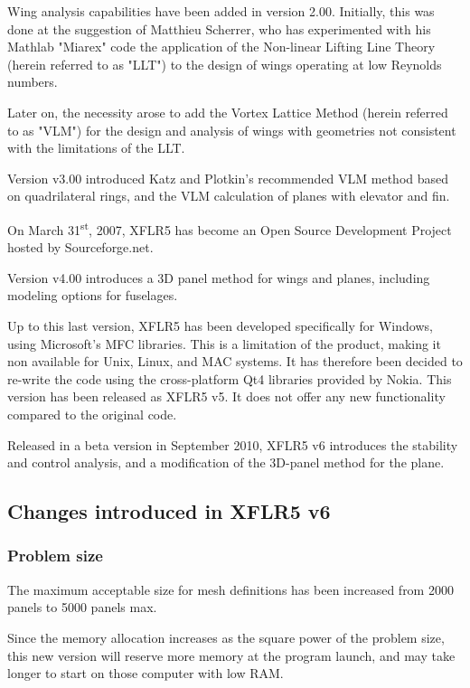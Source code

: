 \documentclass[a4paper,twoside,12pt,dvips]{article}
\begin{document}
Wing analysis capabilities have been added in version 2.00. Initially,
this was done at the suggestion of Matthieu Scherrer, who has
experimented with his Mathlab "Miarex" code the application of the
Non-linear Lifting Line Theory (herein referred to as "LLT") to the
design of wings operating at low Reynolds numbers.

Later on, the necessity arose to add the Vortex Lattice Method (herein
referred to as "VLM") for the design and analysis of wings with
geometries not consistent with the limitations of the LLT.

Version v3.00 introduced Katz and Plotkin's recommended VLM method
based on quadrilateral rings, and the VLM calculation of planes with
elevator and fin.

On March 31\textsuperscript{st}, 2007, XFLR5 has become an Open Source
Development Project hosted by Sourceforge.net.

Version v4.00 introduces a 3D panel method for wings and planes,
including modeling options for fuselages.

Up to this last version, XFLR5 has been developed specifically for
Windows, using Microsoft's MFC libraries. This is a limitation of the
product, making it non available for Unix, Linux, and MAC systems. It
has therefore been decided to re-write the code using the
cross-platform Qt4 libraries provided by Nokia. This version has been
released as XFLR5 v5. It does not offer any new functionality compared
to the original code.

Released in a beta version in September 2010, XFLR5 v6 introduces the
stability and control analysis, and a modification of the 3D-panel
method for the plane.

\subsection{Changes introduced in XFLR5 v6}

\subsubsection{Problem size}

The maximum acceptable size for mesh definitions has been increased from
2000 panels to 5000 panels max.

Since the memory allocation increases as the square power of the problem
size, this new version will reserve more memory at the program launch,
and may take longer to start on those computer with low RAM.
\end{document}

